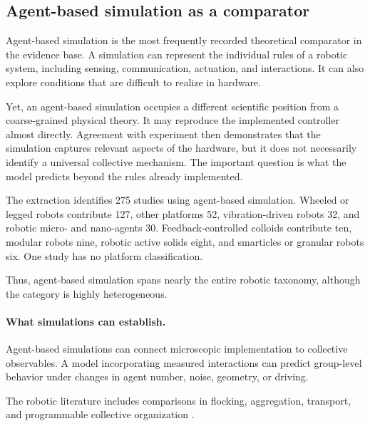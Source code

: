 \subsection{Agent-based simulation as a comparator}
\label{sec:theory-agent-based}

Agent-based simulation is the most frequently
recorded theoretical comparator in the evidence base.
A simulation can represent the individual rules
of a robotic system, including sensing,
communication, actuation, and interactions.
It can also explore conditions that are
difficult to realize in hardware.

Yet, an agent-based simulation occupies a
different scientific position from a
coarse-grained physical theory.
It may reproduce the implemented controller
almost directly. Agreement with experiment
then demonstrates that the simulation
captures relevant aspects of the hardware,
but it does not necessarily identify
a universal collective mechanism.
The important question is what the model
predicts beyond the rules already implemented.

The extraction identifies 275 studies
using agent-based simulation.
Wheeled or legged robots contribute 127,
other platforms 52,
vibration-driven robots 32,
and robotic micro- and nano-agents 30.
Feedback-controlled colloids contribute ten,
modular robots nine,
robotic active solids eight,
and smarticles or granular robots six.
One study has no platform classification.

Thus, agent-based simulation spans nearly
the entire robotic taxonomy, although
the category is highly heterogeneous.

\paragraph*{What simulations can establish.}\hfill\break %

Agent-based simulations can connect microscopic
implementation to collective observables.
A model incorporating measured interactions
can predict group-level behavior under
changes in agent number, noise, geometry,
or driving.

The robotic literature includes comparisons
in flocking, aggregation, transport,
and programmable collective organization
\cite{Turgut2008modelingphasetrans,Navarro2008anapproachtoflock,Garnier2005aggregationbehaviou,Guzzi2014bioinspiredobstacle,Cazenille2016automatedcalibratio,Vsrhelyi2018optimizedflockingo,Ferrante2012selforganizedflock,Mijalkov2016engineeringsensoria,Berlinger2021selforganizedevasi,Fruchart2022nonreciprocalphase,Zhou2024anticipationpromote,Barone2024experimentalandnum,Paramanick2025spontaneousemergenc,Zhang2026emergentnonhermiti}.

